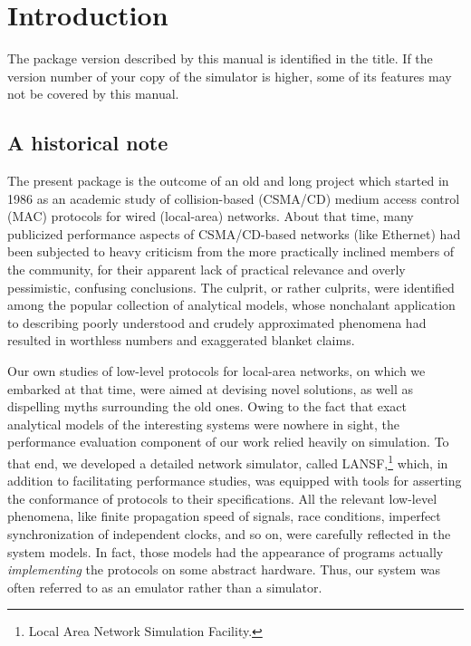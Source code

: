 
\section{Introduction}
\label{rm_in}

The package version described by this manual is identified in the title.
If the version number of your copy of the simulator is higher, some of its features may
not be covered by this manual.

\subsection{A historical note}
\label{rm_in_hi}

The present package is the outcome of an old and long project which started in
1986 as an academic study of collision-based (CSMA/CD) medium access control
(MAC) protocols for wired (local-area) networks.
About that time, many publicized performance aspects of CSMA/CD-based networks
(like Ethernet) had been subjected to heavy criticism from the more
practically inclined members of the community, for their apparent lack of practical relevance
and overly pessimistic, confusing conclusions.
The culprit, or rather culprits, were identified among the popular
collection of analytical models, whose nonchalant application to describing
poorly understood and crudely approximated phenomena had resulted in
worthless numbers and exaggerated blanket claims.

Our own studies of low-level protocols for local-area networks, on
which we embarked at that time, were aimed at
devising novel solutions, as well as dispelling myths surrounding
the old ones.
Owing to the fact that exact analytical models of the interesting systems
were nowhere in sight, the performance evaluation component of our work
relied heavily on simulation.
To that end, we developed a detailed network simulator, called
{\sc LANSF},\footnote{Local Area Network Simulation Facility.}
which, in addition
to facilitating performance studies, was equipped with tools for asserting
the conformance of protocols to their specifications.
All the relevant low-level phenomena, like
finite propagation speed of
signals, race conditions, imperfect synchronization
of independent clocks, and so on,
were carefully reflected in the system models.
In fact, those models had the appearance of programs actually
{\em implementing\/} the protocols on some abstract hardware.
Thus, our system was often referred to as an emulator rather than a
simulator.

